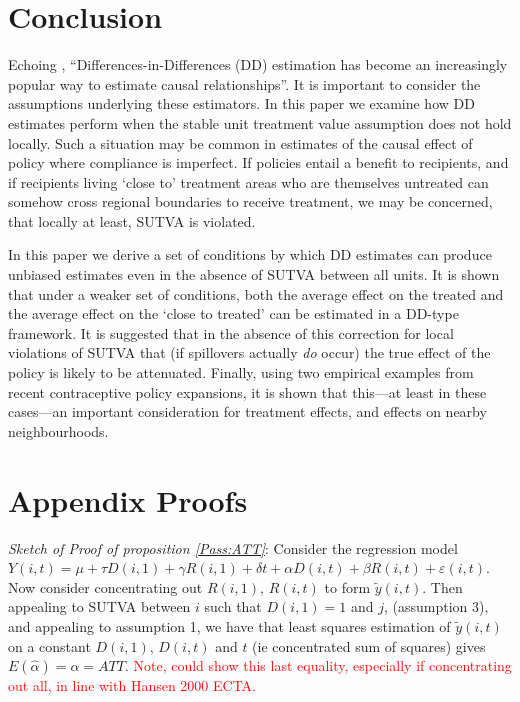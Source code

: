 \documentclass{article}
\begin{document}
\begin{spacing}{1.1}
\section{Conclusion}
Echoing \citet{Bertrandetal2004}, ``Differences-in-Differences (DD) estimation 
has become an increasingly popular way to estimate causal relationships''.  
It is important to consider the assumptions underlying these estimators.  
In this paper we examine how DD estimates perform when the stable unit treatment 
value assumption does not hold locally.  Such a situation may be common in estimates 
of the causal effect of policy where compliance is imperfect.  If policies entail a 
benefit to recipients, and if recipients living `close to' treatment areas who are 
themselves untreated can somehow cross regional boundaries to receive treatment, we 
may be concerned, that locally at least, SUTVA is violated.

In this paper we derive a set of conditions by which DD estimates can produce 
unbiased estimates even in the absence of SUTVA between all units.  It is shown
that under a weaker set of conditions, both the average effect on the treated
and the average effect on the `close to treated' can be estimated in a DD-type
framework.  It is suggested that in the absence of this correction for local 
violations of SUTVA that (if spillovers actually \emph{do} occur) the true 
effect of the policy is likely to be attenuated.  Finally, using two empirical 
examples from recent contraceptive policy expansions, it is shown that this---at
least in these cases---an important consideration for treatment effects, and
effects on nearby neighbourhoods.


\newpage

\newpage

\appendix
\section{Appendix Proofs}
\emph{Sketch of Proof of proposition \ref{Pass:ATT}}: Consider the regression 
model $Y(i,t)=\mu+\tau D(i,1) + \gamma R(i,1) + \delta t + \alpha D(i,t) + 
\beta R(i,t) + \varepsilon(i,t)$.  Now consider concentrating out $R(i,1)$, 
$R(i,t)$ to form $\tilde{y}(i,t)$.  Then appealing to SUTVA between $i$ such 
that $D(i,1)=1$ and $j$, (assumption 3), and appealing to assumption 1, we have 
that least squares estimation of $\tilde{y}(i,t)$ on a constant $D(i,1)$,
$D(i,t)$ and $t$ (ie concentrated sum of squares) gives
$E(\hat\alpha)=\alpha=ATT$.  \textcolor{red}{Note, could show this
  last equality, especially if concentrating out all, in line with
  Hansen 2000 ECTA.}


\end{spacing}
\end{document}
